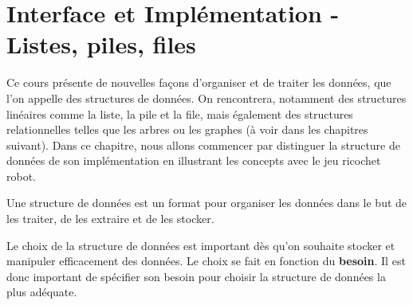 \documentclass{report}
\begin{document}







\chapter{Interface et Implémentation - Listes, piles, files}
Ce cours présente de nouvelles façons d'organiser et de traiter les données, que l'on appelle des structures de données. On rencontrera, notamment des structures linéaires comme la liste, la pile et la file, mais également des structures relationnelles telles que les arbres ou les graphes (à voir dans les chapitres suivant). Dans ce chapitre, nous allons commencer par distinguer la structure de données de son implémentation en illustrant les concepts avec le jeu ricochet robot.\\

\begin{tcolorbox}[enhanced,
    colback=green!25!black!10!white,colframe=green!75!black,title=Structure de données,
    drop fuzzy shadow,watermark color=white]
    Une structure de données est un format pour organiser les données dans le but de les traiter, de les extraire et de les stocker. 
  \end{tcolorbox}


Le choix de la structure de données est important dès qu'on souhaite stocker et manipuler efficacement des données. Le choix se fait en fonction du \textbf{besoin}. Il est donc important de spécifier son besoin pour choisir la structure de données la plus adéquate.\\
\end{document}
